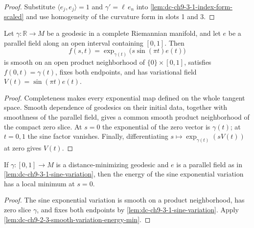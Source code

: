 \begin{proof}
  \leanok
  \sketch
  Substitute $\langle e_j,e_j\rangle=1$ and $\gamma'=\ell\,e_n$ into
  \cref{lem:dc-ch9-3-1-index-form-scaled} and use homogeneity of the curvature form in slots
  1 and 3.
\end{proof}
\begin{lemma}
  \label{lem:dc-ch9-3-1-sine-variation}
  \leanok
  Let $\gamma:\mathbb R\to M$ be a geodesic in a complete Riemannian
  manifold, and let $e$ be a parallel field along an open interval containing
  $[0,1]$. Then
  \[
    f(s,t)=\exp_{\gamma(t)}\!\bigl(s\sin(\pi t)e(t)\bigr)
  \]
  is smooth on an open product neighborhood of
  $\{0\}\times[0,1]$, satisfies $f(0,t)=\gamma(t)$, fixes both endpoints, and
  has variational field $V(t)=\sin(\pi t)e(t)$.
\end{lemma}
\begin{proof}
  \leanok
  \sketch
  Completeness makes every exponential map defined on the whole tangent
  space. Smooth dependence of geodesics on their initial data, together with
  smoothness of the parallel field, gives a common smooth product
  neighborhood of the compact zero slice. At $s=0$ the exponential of the
  zero vector is $\gamma(t)$; at $t=0,1$ the sine factor vanishes. Finally,
  differentiating $s\mapsto\exp_{\gamma(t)}(sV(t))$ at zero gives $V(t)$.
\end{proof}
\begin{lemma}
  \label{lem:dc-ch9-3-1-sine-energy-min}
  \leanok
  If $\gamma:[0,1]\to M$ is a distance-minimizing geodesic and $e$ is a
  parallel field as in \cref{lem:dc-ch9-3-1-sine-variation}, then the energy
  of the sine exponential variation has a local minimum at $s=0$.
\end{lemma}
\begin{proof}
  \leanok
  \sketch
  The sine exponential variation is smooth on a product neighborhood, has
  zero slice $\gamma$, and fixes both endpoints by
  \cref{lem:dc-ch9-3-1-sine-variation}. Apply
  \cref{lem:dc-ch9-2-3-smooth-variation-energy-min}.
\end{proof}
